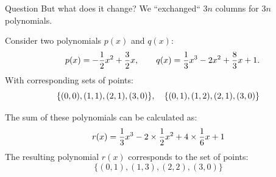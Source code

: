 \documentclass{zkdl-presentation-template}
\begin{document}
    \begin{frame}
        \begin{alertblock}{Question}
            But what does it change? We ``exchanged`` $3n$ columns for $3n$ polynomials.
        \end{alertblock}

        \pause
        \vspace{-5pt}
        Consider two polynomials $p(x)$ and $q(x)$:
        \begin{equation*}
            \quad p(x) = -\frac{1}{2}x^2 + \frac{3}{2}x, \qquad
            q(x) = \frac{1}{3}x^3 - 2x^2 + \frac{8}{3}x + 1.
            \vspace{-5pt}
        \end{equation*}
        With corresponding sets of points:
        \vspace{-5pt}
        \begin{equation*}
            \{(0, 0), (1, 1), (2, 1), (3, 0)\}, \quad \{(0, 1), (1, 2), (2, 1), (3, 0)\}
            \vspace{-10pt}
        \end{equation*}
        
        \pause
        The sum of these polynomials can be calculated as:
        \vspace{-5pt}
        \begin{equation*}
            r(x) = \frac{1}{3}x^3 - 2\times\frac{1}{2}x^2 + 4\times\frac{1}{6}x + 1
            \vspace{-5pt}
        \end{equation*}
        The resulting polynomial $r(x)$ corresponds to the set of points:
        \vspace{-5pt}
        \begin{equation*}
            \{(0, 1), (1, 3), (2, 2), (3, 0)\}
        \end{equation*}
    \end{frame}
\end{document}
